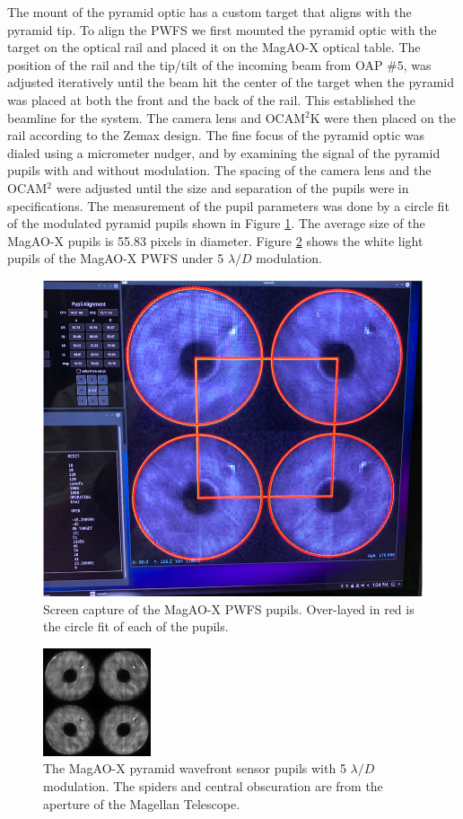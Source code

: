 The mount of the pyramid optic has a custom target that aligns with the pyramid tip. To align the PWFS we first mounted the pyramid optic with the target on the optical rail and placed it on the MagAO-X optical table. The position of the rail and the tip/tilt of the incoming beam from OAP $\#5$, was adjusted iteratively until the beam hit the center of the target when the pyramid was placed at both the front and the back of the rail. This established the beamline for the system. The camera lens and OCAM$^2$K were then placed on the rail according to the Zemax design. The fine focus of the pyramid optic was dialed using a micrometer nudger, and by examining the signal of the pyramid pupils with and without modulation. The spacing of the camera lens and the OCAM$^2$ were adjusted until the size and separation of the pupils were in specifications. The measurement of the pupil parameters was done by a circle fit of the modulated pyramid pupils shown in Figure \ref{fig:fitPupils}. The average size of the MagAO-X pupils is 55.83 pixels in diameter. Figure \ref{fig:MagAOXpupils} shows the white light pupils of the MagAO-X PWFS under 5 $\lambda/D$ modulation.

\begin{figure}
    \centering
    \includegraphics[width=.8\textwidth]{Chapter Materials/Chapter Five Materials/magaoxfitpupils.png}
    \caption{Screen capture of the MagAO-X PWFS pupils. Over-layed in red is the circle fit of each of the pupils. }
    \label{fig:fitPupils}
\end{figure}

\begin{figure}
    \centering
    \includegraphics{Chapter Materials/Chapter Three Materials/MagAOXpupil5LD.png}
    \caption{The MagAO-X pyramid wavefront sensor pupils with 5 $\lambda/D$ modulation. The spiders and central obscuration are from the aperture of the Magellan Telescope.  }
    \label{fig:MagAOXpupils}
\end{figure}

